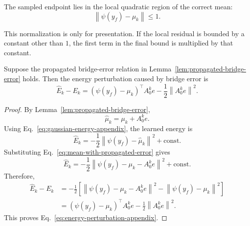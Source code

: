 \begin{assumption}
\label{ass:normalized-local-region}
The sampled endpoint lies in the local quadratic region of the correct mean:
\begin{equation}
    \left\|
        \psi(y_f)-\mu_k
    \right\|
    \le
    1 .
    \label{eq:normalized-local-region}
\end{equation}
\end{assumption}

This normalization is only for presentation.
If the local residual is bounded by a constant other than $1$, the first term in the final bound is
multiplied by that constant.

\begin{lemma}
\label{lem:exact-energy-perturbation}
Suppose the propagated bridge-error relation in Lemma~\ref{lem:propagated-bridge-error} holds.
Then the energy perturbation caused by bridge error is
\begin{equation}
    \widehat{E}_k-E_k
    =
    \left(
        \psi(y_f)-\mu_k
    \right)^\top
    A_0^k e
    -
    \frac{1}{2}
    \left\|
        A_0^k e
    \right\|^2 .
    \label{eq:energy-perturbation-appendix}
\end{equation}
\end{lemma}

\begin{proof}
By Lemma~\ref{lem:propagated-bridge-error},
\begin{equation}
    \widehat{\mu}_k
    =
    \mu_k+A_0^k e .
    \label{eq:mean-with-propagated-error}
\end{equation}
Using Eq.~\eqref{eq:gaussian-energy-appendix}, the learned energy is
\begin{equation}
    \widehat{E}_k
    =
    -\frac{1}{2}
    \left\|
        \psi(y_f)-\widehat{\mu}_k
    \right\|^2
    +
    \mathrm{const}.
\end{equation}
Substituting Eq.~\eqref{eq:mean-with-propagated-error} gives
\begin{equation}
    \widehat{E}_k
    =
    -\frac{1}{2}
    \left\|
        \psi(y_f)-\mu_k-A_0^k e
    \right\|^2
    +
    \mathrm{const}.
\end{equation}
Therefore,
\begin{align}
    \widehat{E}_k-E_k
    &=
    -\frac{1}{2}
    \left[
        \left\|
            \psi(y_f)-\mu_k-A_0^k e
        \right\|^2
        -
        \left\|
            \psi(y_f)-\mu_k
        \right\|^2
    \right] \\
    &=
    \left(
        \psi(y_f)-\mu_k
    \right)^\top
    A_0^k e
    -
    \frac{1}{2}
    \left\|
        A_0^k e
    \right\|^2 .
\end{align}
This proves Eq.~\eqref{eq:energy-perturbation-appendix}.
\end{proof}

